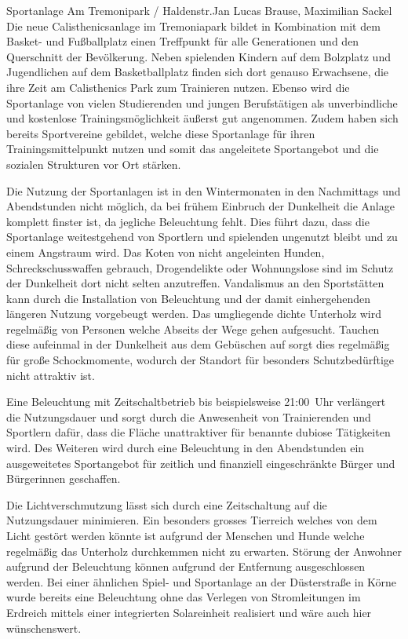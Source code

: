 \documentclass{../../templates/amendment}
\date{29. Dezember 2024}
\begin{document}
\begin{boxed}{Sportanlage Am Tremonipark / Haldenstr.}{Jan Lucas Brause, Maximilian Sackel}
    Die neue Calisthenicsanlage im Tremoniapark bildet in Kombination mit dem Basket- und Fußballplatz einen Treffpunkt für alle Generationen und den Querschnitt der Bevölkerung.
    Neben spielenden Kindern auf dem Bolzplatz und Jugendlichen auf dem Basketballplatz finden sich dort genauso Erwachsene, die ihre Zeit am Calisthenics Park zum Trainieren nutzen.
    Ebenso wird die Sportanlage von vielen Studierenden und jungen Berufstätigen als unverbindliche und kostenlose Trainingsmöglichkeit äußerst gut angenommen.
    Zudem haben sich bereits Sportvereine gebildet, welche diese Sportanlage für
    ihren Trainingsmittelpunkt nutzen und somit das angeleitete Sportangebot und
    die sozialen Strukturen vor Ort stärken.

    Die Nutzung der Sportanlagen ist in den Wintermonaten in den Nachmittags und
    Abendstunden nicht möglich, da bei frühem Einbruch der Dunkelheit die
    Anlage komplett finster ist, da jegliche Beleuchtung fehlt.
    Dies führt dazu, dass die Sportanlage weitestgehend von Sportlern und
    spielenden ungenutzt bleibt und zu einem Angstraum wird.
    Das Koten von nicht angeleinten Hunden, Schreckschusswaffen gebrauch,
    Drogendelikte oder Wohnungslose sind im Schutz der Dunkelheit dort nicht
    selten anzutreffen.
    Vandalismus an den Sportstätten kann durch die Installation von Beleuchtung
    und der damit einhergehenden längeren Nutzung vorgebeugt werden.
    Das umgliegende dichte Unterholz wird regelmäßig von Personen welche
    Abseits der Wege gehen aufgesucht.
    Tauchen diese aufeinmal in der Dunkelheit aus dem Gebüschen auf sorgt dies
    regelmäßig für große Schockmomente, wodurch der Standort für besonders
    Schutzbedürftige nicht attraktiv ist.

    Eine Beleuchtung mit Zeitschaltbetrieb bis beispielsweise 21:00~Uhr
    verlängert die Nutzungsdauer und sorgt durch die Anwesenheit von
    Trainierenden und Sportlern dafür, dass die Fläche unattraktiver für
    benannte dubiose Tätigkeiten wird.
    Des Weiteren wird durch eine Beleuchtung in den Abendstunden ein
    ausgeweitetes Sportangebot für zeitlich und finanziell eingeschränkte Bürger
    und Bürgerinnen geschaffen.

    Die Lichtverschmutzung lässt sich durch eine Zeitschaltung auf die
    Nutzungsdauer minimieren.
    Ein besonders grosses Tierreich welches von dem Licht gestört werden
    könnte ist aufgrund der Menschen und Hunde welche regelmäßig das Unterholz
    durchkemmen nicht zu erwarten.
    Störung der Anwohner aufgrund der Beleuchtung können aufgrund der Entfernung
    ausgeschlossen werden.
    Bei einer ähnlichen Spiel- und Sportanlage an der Düsterstraße in Körne
    wurde bereits eine Beleuchtung ohne das Verlegen von Stromleitungen im
    Erdreich mittels einer integrierten Solareinheit realisiert und wäre auch
    hier wünschenswert.


\end{boxed}
\end{document}
